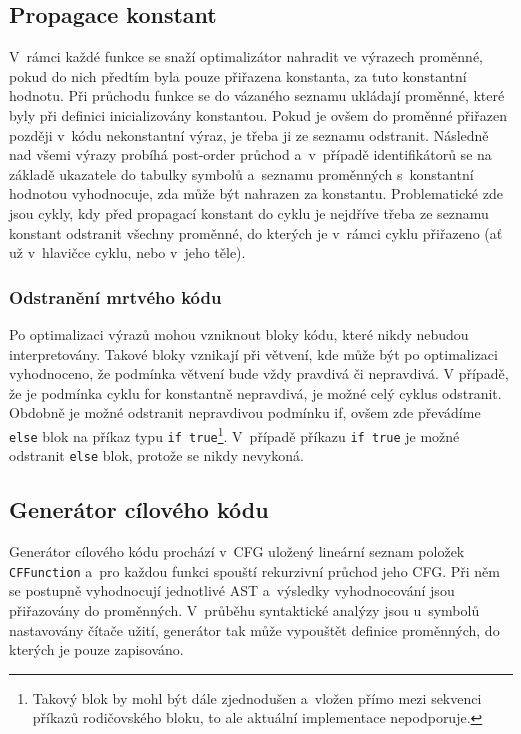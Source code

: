 \documentclass[11pt]{article}
\begin{document}
\subsection{Propagace konstant}
V~rámci každé funkce se snaží optimalizátor nahradit ve výrazech proměnné, pokud do nich předtím byla pouze přiřazena konstanta, za tuto konstantní hodnotu\cite{ConstantPropagation}. Při průchodu funkce se do vázaného seznamu ukládají proměnné, které byly při definici inicializovány konstantou. Pokud je ovšem do proměnné přiřazen později v~kódu nekonstantní výraz, je třeba ji ze seznamu odstranit. Následně nad všemi výrazy probíhá post-order průchod a~v~případě identifikátorů se na základě ukazatele do tabulky symbolů a~seznamu proměnných s~konstantní hodnotou vyhodnocuje, zda může být nahrazen za konstantu. Problematické zde jsou cykly, kdy před propagací konstant do cyklu je nejdříve třeba ze seznamu konstant odstranit všechny proměnné, do kterých je v~rámci cyklu přiřazeno (ať už v~hlavičce cyklu, nebo v~jeho těle).

\subsubsection{Odstranění mrtvého kódu}
Po optimalizaci výrazů mohou vzniknout bloky kódu, které nikdy nebudou interpretovány. Takové bloky vznikají při větvení, kde může být po optimalizaci vyhodnoceno, že podmínka větvení bude vždy pravdivá či nepravdivá. V případě, že je podmínka cyklu for konstantně nepravdivá, je možné celý cyklus odstranit. Obdobně je možné odstranit nepravdivou podmínku if, ovšem zde převádíme \texttt{else} blok na příkaz typu \texttt{if true}\footnote{Takový blok by mohl být dále zjednodušen a~vložen přímo mezi sekvenci příkazů rodičovského bloku, to ale aktuální implementace nepodporuje.}. V~případě příkazu \texttt{if true} je možné odstranit \texttt{else} blok, protože se nikdy nevykoná.

\subsection{Generátor cílového kódu}

Generátor cílového kódu prochází v~CFG uložený lineární seznam položek \texttt{CFFunction} a~pro každou funkci spouští rekurzivní průchod jeho CFG. Při něm se postupně vyhodnocují jednotlivé AST a~výsledky vyhodnocování jsou přiřazovány do proměnných. V~průběhu syntaktické analýzy jsou u~symbolů nastavovány čítače užití, generátor tak může vypouštět definice proměnných, do kterých je pouze zapisováno.
\end{document}

